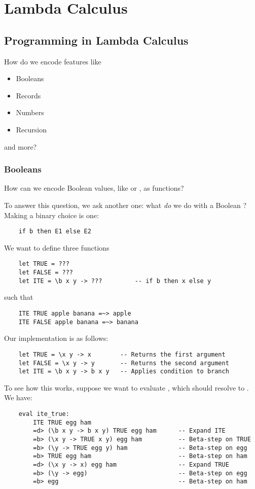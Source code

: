 \documentclass[letterpaper]{article}
\begin{document}
\section{Lambda Calculus}

\subsection{Programming in Lambda Calculus}
How do we encode features like
\begin{itemize}
    \item Booleans
    \item Records
    \item Numbers
    \item Recursion
\end{itemize}
and more? 

\subsubsection{Booleans}
How can we encode Boolean values, like  or , as functions? 

\bigskip 

To answer this question, we ask another one: what \emph{do} we do with a Boolean ? Making a binary choice is one: 
\begin{verbatim}
    if b then E1 else E2
\end{verbatim}
We want to define three functions 
\begin{verbatim}
    let TRUE = ??? 
    let FALSE = ??? 
    let ITE = \b x y -> ???         -- if b then x else y
\end{verbatim}
such that 
\begin{verbatim}
    ITE TRUE apple banana =~> apple 
    ITE FALSE apple banana =~> banana
\end{verbatim}
Our implementation is as follows: 
\begin{verbatim}
    let TRUE = \x y -> x        -- Returns the first argument
    let FALSE = \x y -> y       -- Returns the second argument 
    let ITE = \b x y -> b x y   -- Applies condition to branch
\end{verbatim}
To see how this works, suppose we want to evaluate , which should resolve to . We have:  
\begin{verbatim}
    eval ite_true: 
        ITE TRUE egg ham
        =d> (\b x y -> b x y) TRUE egg ham      -- Expand ITE 
        =b> (\x y -> TRUE x y) egg ham          -- Beta-step on TRUE 
        =b> (\y -> TRUE egg y) ham              -- Beta-step on egg 
        =b> TRUE egg ham                        -- Beta-step on ham 
        =d> (\x y -> x) egg ham                 -- Expand TRUE 
        =b> (\y -> egg)                         -- Beta-step on egg 
        =b> egg                                 -- Beta-step on ham
\end{verbatim}
\end{document}
